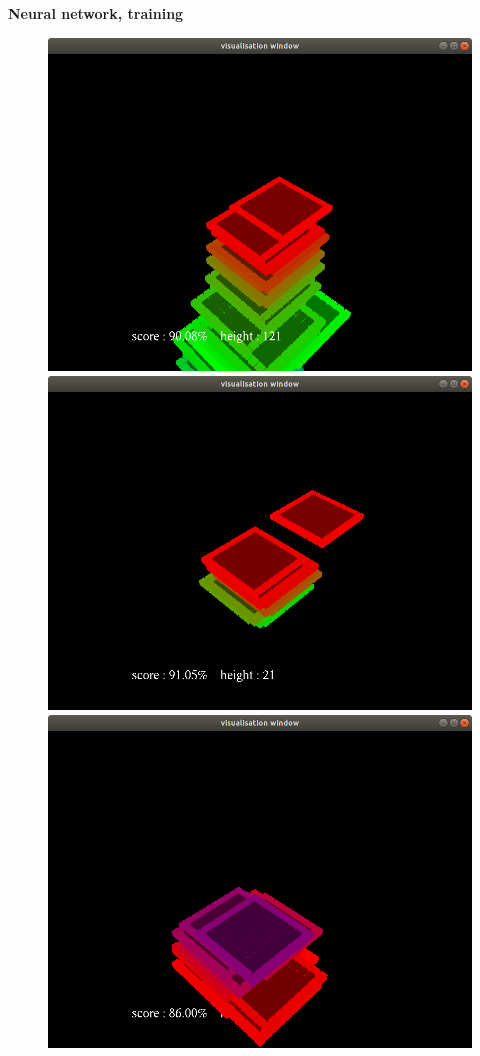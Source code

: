 \documentclass[xcolor=dvipsnames]{beamer}
\begin{document}
\begin{frame}{\bf Neural network, training}


\begin{minipage}{.5\textwidth}

\begin{figure}[htbp]
  \includegraphics[scale=0.07]{tr_01.png}
  \includegraphics[scale=0.07]{tr_02.png}
  \includegraphics[scale=0.07]{tr_03.png}

\end{figure}
\end{minipage}
\end{frame}
\end{document}
